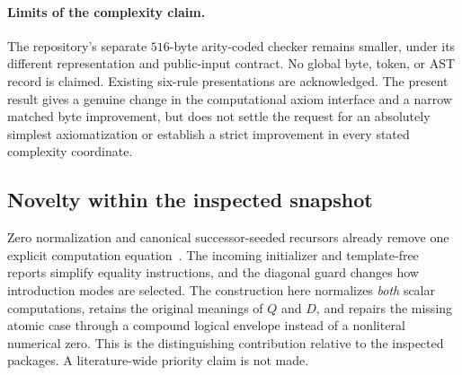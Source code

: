 \paragraph{Limits of the complexity claim.}
The repository's separate $516$-byte arity-coded checker remains smaller,
under its different representation and public-input contract.
No global byte, token, or AST record is claimed. Existing six-rule
presentations are acknowledged. The present result gives a genuine change
in the computational axiom interface and a narrow matched byte improvement,
but does not settle the request for an absolutely simplest axiomatization
or establish a strict improvement in every stated complexity coordinate.

\subsection{Novelty within the inspected snapshot}

Zero normalization and canonical successor-seeded recursors already remove
one explicit computation equation~\cite{canonical,zero}. The incoming
initializer and template-free reports simplify equality instructions,
and the diagonal guard changes how introduction modes are selected.
The construction here normalizes \emph{both} scalar computations, retains
the original meanings of $Q$ and $D$, and repairs the missing atomic case
through a compound logical envelope instead of a nonliteral numerical
zero. This is the distinguishing contribution relative to the inspected
packages. A literature-wide priority claim is not made.
